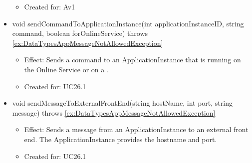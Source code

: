 \begin{description}
\begin{itemize}[noitemsep,nolistsep,leftmargin=-.25cm]
\begin{itemize}[noitemsep,nolistsep]
\item Created for: Av1
        \end{itemize}
      \item \textsf{void sendCommandToApplicationInstance(int applicationInstanceID, string command, boolean forOnlineService) throws \ref{ex:DataTypesAppMessageNotAllowedException}}
        \begin{itemize}[noitemsep,nolistsep]
           \item Effect: Sends a command to an ApplicationInstance that is running on the Online Service or on a .
\item Created for: UC26.1
        \end{itemize}
      \item \textsf{void sendMessageToExternalFrontEnd(string hostName, int port, string message) throws \ref{ex:DataTypesAppMessageNotAllowedException}}
        \begin{itemize}[noitemsep,nolistsep]
           \item Effect: Sends a message from an ApplicationInstance to an external front end. The ApplicationInstance provides the hostname and port.
\item Created for: UC26.1
        \end{itemize}
    \end{itemize}
    \end{description}


